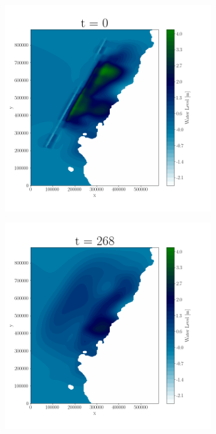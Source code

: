 
\begin{figure}[H]
\centering
\begin{subfigure}[b]{.4\linewidth}
\includegraphics[width=\linewidth]{Figures/2-1.png}
\caption{}
\end{subfigure}
\begin{subfigure}[b]{.4\linewidth}
\includegraphics[width=\linewidth]{Figures/2-2.png}
\caption{}
\end{subfigure}


\end{figure}
